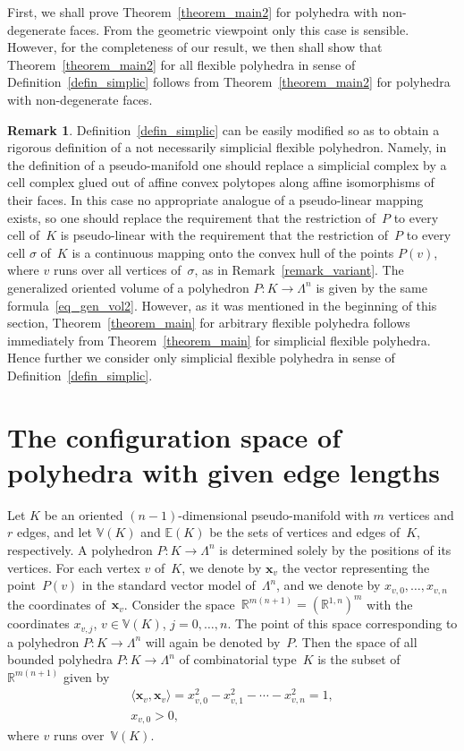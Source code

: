 \documentclass[reqno,tbtags,12pt]{amsart}
\numberwithin{equation}{section}
\newcommand{\R}{\mathbb{R}}
\newcommand{\E}{\mathbb{E}}
\newcommand{\V}{\mathbb{V}}
\newcommand{\bx}{\mathbf{x}}
\theoremstyle{definition}
\newtheorem{remark}[theorem]{Remark}
\begin{document}
First, we shall prove Theorem~\ref{theorem_main2} for polyhedra with non-degenerate faces. From the geometric viewpoint only this case is sensible. However, for the completeness of our result, we then shall show that Theorem~\ref{theorem_main2} for all flexible polyhedra in sense of Definition~\ref{defin_simplic} follows from Theorem~\ref{theorem_main2} for polyhedra with non-degenerate faces. 



\begin{remark}
Definition~\ref{defin_simplic} can be easily modified so as to obtain a rigorous definition of a not necessarily simplicial flexible polyhedron. Namely,  in the definition of a pseudo-manifold one should replace a simplicial complex by a cell complex glued out of affine convex polytopes along affine isomorphisms of their faces. In this case no appropriate analogue of a pseudo-linear mapping exists, so one should replace the requirement that the restriction of~$P$ to every cell of~$K$ is pseudo-linear 
with the requirement  that the restriction of~$P$ to every cell $\sigma$ of~$K$ is a continuous mapping onto  the convex hull of the points $ P(v)$, where $v$ runs over all vertices of~$\sigma$, as in Remark~\ref{remark_variant}. The generalized oriented volume of a polyhedron $P\colon K\to\Lambda^n$ is given by the same formula~\eqref{eq_gen_vol2}. However, as it was mentioned in the beginning of this section, Theorem~\ref{theorem_main} for arbitrary flexible polyhedra follows immediately from Theorem~\ref{theorem_main} for simplicial flexible polyhedra. Hence further we consider only  simplicial flexible polyhedra in sense of Definition~\ref{defin_simplic}.
\end{remark} 
 

\section{The configuration space of polyhedra with given  edge lengths}\label{section_config}

Let $K$ be an oriented $(n-1)$-dimensional pseudo-manifold with $m$ vertices and $r$ edges, and let $\V(K)$ and $\E(K)$ be the sets of vertices and edges of~$K$, respectively. A polyhedron $ P\colon K\to \Lambda^n$ is determined solely by the positions of its vertices. 
For each vertex $v$ of~$K$, we denote by $\bx_v$ the vector representing the point~$P(v)$ in the standard vector model of~$\Lambda^{n}$, and we denote by $x_{v,0},\ldots,x_{v,n}$ the coordinates of~$\bx_v$. Consider the space~$\R^{m(n+1)}=(\R^{1,n})^m$ with the coordinates $x_{v,j}$, $v\in\V(K)$, $j=0,\ldots,n$. The point of this space corresponding to a polyhedron $ P\colon K\to \Lambda^n$ will again be denoted by~$ P$. Then the space of all bounded  polyhedra $ P\colon K\to \Lambda^n$ of combinatorial type~$K$ is the subset of~$\R^{m(n+1)}$ given by
\begin{gather}
\langle \bx_v,\bx_v\rangle=x_{v,0}^2-x_{v,1}^2-\cdots-x_{v,n}^2=1,\label{eq_vL}\\
x_{v,0}>0,\label{eq_vL+}
\end{gather}
where $v$ runs over~$\V(K)$.
\end{document}
